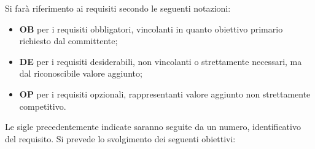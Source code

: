 \documentclass[a4paper, 12pt]{article}
\begin{document}
Si farà riferimento ai requisiti secondo le seguenti notazioni:

\begin{itemize}
    \item \textbf{OB} per i requisiti obbligatori, vincolanti in quanto obiettivo primario richiesto dal committente;
    \item \textbf{DE} per i requisiti desiderabili, non vincolanti o strettamente necessari, ma dal riconoscibile valore aggiunto;
    \item \textbf{OP} per i requisiti opzionali, rappresentanti valore aggiunto non strettamente competitivo.
\end{itemize}

{Le sigle precedentemente indicate saranno seguite da un numero, identificativo del requisito. Si prevede lo svolgimento dei seguenti obiettivi: \\[0.5cm] \par}

\end{document}
